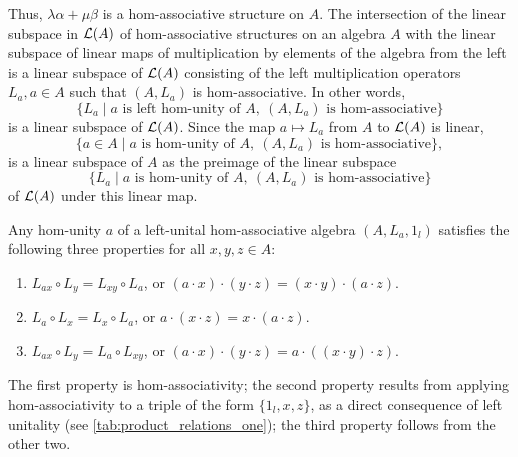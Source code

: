 \documentclass[12pt]{article}
\begin{document}
		Thus, $\lambda \alpha+\mu \beta$ is a hom-associative structure on $A$.
		The intersection of the linear subspace in ${\cal L}(A)$ of hom-associative structures on an algebra $A$ with the linear subspace of linear maps of multiplication by elements of the algebra from the left is a linear subspace of ${\cal L}(A)$ consisting of the left multiplication operators $L_a, a\in A$ such that $(A,L_a)$ is hom-associative.
		In other words, $$\{L_a \mid a \text{ is left hom-unity of } A,\ (A,L_a) \text{ is hom-associative}\}$$ is a linear subspace of ${\cal L}(A)$. Since the map $a\mapsto L_a$ from $A$ to ${\cal L}(A)$ is linear, $$\{a\in A \mid a \text{ is hom-unity of } A,\ (A,L_a) \text{ is hom-associative}\},$$
		is a linear subspace of $A$ as the preimage of
		the linear subspace $$\{L_a \mid a \text{ is hom-unity of } A,\ (A,L_a) \text{ is hom-associative}\}$$ of ${\cal L}(A)$ under this linear map.
		
		Any hom-unity $a$ of a left-unital hom-associative algebra $(A,L_a,1_l)$ satisfies the following three properties for all $x,y,z\in A$:
		\begin{enumerate}[label=\textnormal{\arabic*)}]
			\item $L_{ax}\circ L_y=L_{xy}\circ L_a$, or $(a\cdot x)\cdot (y\cdot z)=(x\cdot y)\cdot (a\cdot z)$.
			\item $L_a\circ L_x=L_x\circ L_a$, or $a\cdot (x\cdot z)=x\cdot (a\cdot z)$.
			\item $L_{ax}\circ L_y=L_a\circ L_{xy}$, or $(a\cdot x)\cdot (y\cdot z)=a\cdot ((x\cdot y)\cdot z)$.
		\end{enumerate}
		The first property is hom-associativity; the second property results from applying hom-associativity to a triple of the form $\{1_l,x,z\}$, as a direct consequence of left unitality (see \cref{tab:product_relations_one}); the third property follows from the other two.
		
\end{document}
